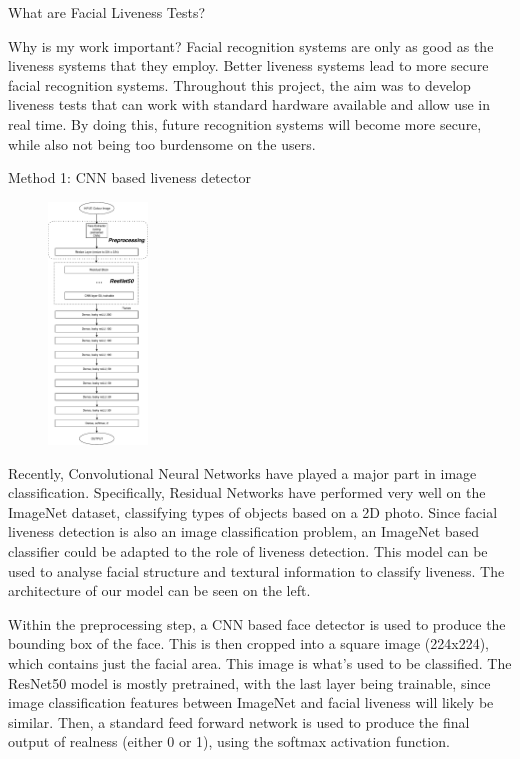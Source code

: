 \documentclass[final]{beamer}
\begin{document}
\begin{frame}{}
\begin{columns}[t]
\begin{column}{.48\linewidth}
\begin{block}{What are Facial Liveness Tests?}
        \end{block}
        \begin{block}{Why is my work important?}
          Facial recognition systems are only as good as the liveness systems that they employ. Better liveness systems lead to more secure facial recognition systems. Throughout this project, the aim was to develop liveness tests that can work with standard hardware available and allow use in real time. By doing this, future recognition systems will become more secure, while also not being too burdensome on the users. 
        \end{block}

        \begin{block}{Method 1: CNN based liveness detector}
          \begin{figure}
            \includegraphics[width=100px]{2DCNNArchitecture.pdf}
          \end{figure}
          Recently, Convolutional Neural Networks have played a major part in image classification. Specifically,
          Residual Networks have performed very well on the ImageNet dataset, classifying types of objects based on a
          2D photo. Since facial liveness detection is also an image classification problem, an ImageNet based classifier could
          be adapted to the role of liveness detection. This model can be used to analyse facial structure and textural information
          to classify liveness. The architecture of our model can be seen on the left.

          Within the preprocessing step, a CNN based face detector is used to produce the bounding box of the face. This is then cropped
          into a square image (224x224), which contains just the facial area. This image is what's used to be classified. The ResNet50 model
          is mostly pretrained, with the last layer being trainable, since image classification features between ImageNet and facial liveness will
          likely be similar. Then, a standard feed forward network is used to produce the final output of realness (either 0 or 1), using the softmax
          activation function. 


\end{block}
\end{column}
\end{columns}
\end{frame}
\end{document}

